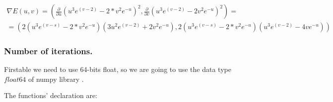 \begin{multline*}
  \nabla E(u,v) = \left( \frac{\partial}{\partial u}(u^3 e^{(v-2)} - 2* v^2 e^{-u})^2 , \frac{\partial}{\partial v} (u^3 e^{(v-2)} - 2 v^2 e^{-u})^2 \right) = \\
 =  \left(2(u^3 e^{(v-s)} - 2* v^2 e^{-u})(3u^2e^{(v-2)} + 2 v^2 e^{-u} ), 2(u^3 e^{(v-s)} - 2* v^2 e^{-u})(u^3 e^{(v-2)} - 4 v e^{-u}) \right)
\end{multline*}


\subsubsection{Number of iterations.}

Firstable we need to use 64-bits float, so we are going to use the data type $float64$ of numpy library \cite{float64}.

The functions' declaration are:

\begin{verbatim}
\end{verbatim}